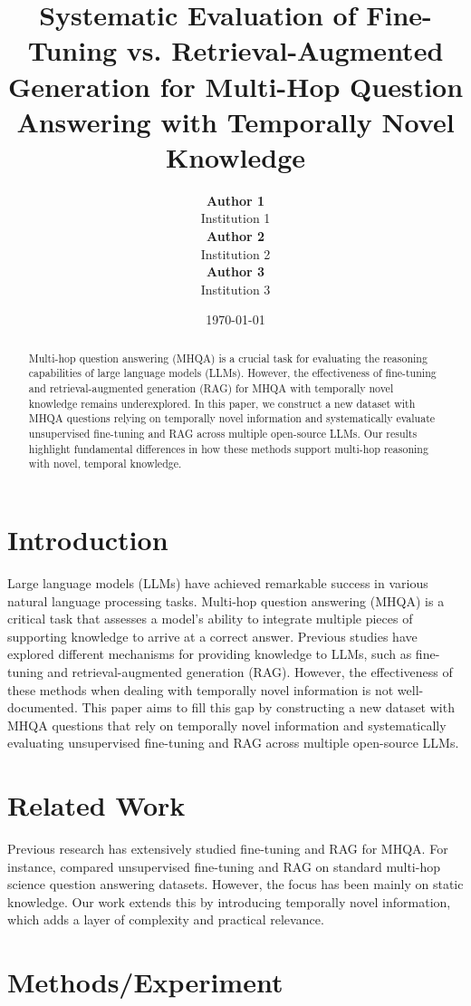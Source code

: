 \documentclass[11pt]{article}
\title{Systematic Evaluation of Fine-Tuning vs. Retrieval-Augmented Generation for Multi-Hop Question Answering with Temporally Novel Knowledge}
\author{
  \textbf{Author 1} \\
  Institution 1 \\
  \textbf{Author 2} \\
  Institution 2 \\
  \textbf{Author 3} \\
  Institution 3 \\
}
\date{\today}
\begin{document}
\maketitle

\begin{abstract}
  Multi-hop question answering (MHQA) is a crucial task for evaluating the reasoning capabilities of large language models (LLMs). However, the effectiveness of fine-tuning and retrieval-augmented generation (RAG) for MHQA with temporally novel knowledge remains underexplored. In this paper, we construct a new dataset with MHQA questions relying on temporally novel information and systematically evaluate unsupervised fine-tuning and RAG across multiple open-source LLMs. Our results highlight fundamental differences in how these methods support multi-hop reasoning with novel, temporal knowledge.
\end{abstract}

\section{Introduction}
Large language models (LLMs) have achieved remarkable success in various natural language processing tasks. Multi-hop question answering (MHQA) is a critical task that assesses a model's ability to integrate multiple pieces of supporting knowledge to arrive at a correct answer. Previous studies have explored different mechanisms for providing knowledge to LLMs, such as fine-tuning and retrieval-augmented generation (RAG). However, the effectiveness of these methods when dealing with temporally novel information is not well-documented. This paper aims to fill this gap by constructing a new dataset with MHQA questions that rely on temporally novel information and systematically evaluating unsupervised fine-tuning and RAG across multiple open-source LLMs.

\section{Related Work}
Previous research has extensively studied fine-tuning and RAG for MHQA. For instance, \cite{yang2026finetuningvsragmultihop} compared unsupervised fine-tuning and RAG on standard multi-hop science question answering datasets. However, the focus has been mainly on static knowledge. Our work extends this by introducing temporally novel information, which adds a layer of complexity and practical relevance.

\section{Methods/Experiment}
\end{document}
